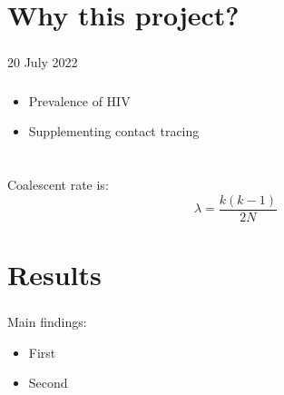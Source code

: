 \documentclass{beamer}
\begin{document}
\section{Why this project?}

\begin{frame} \frametitle{}

    \begin{center}

        \vfill
        \small{20 July 2022}

        \vfill
    \end{center}


\end{frame}

\begin{frame} \frametitle{\insertsection}

    \begin{itemize}
        \item Prevalence of HIV
        \item Supplementing contact tracing
    \end{itemize}

\end{frame}

\section{}

\begin{frame} \frametitle{\insertsection}

    Coalescent rate is:
    \[
        \lambda = \frac{k (k-1)}{2 N}
    \]

\end{frame}

\section{Results}

\begin{frame} \frametitle{\insertsection}

    Main findings:
    \begin{itemize}
        \item First
        \item Second
    \end{itemize}

\end{frame}
\end{document}
